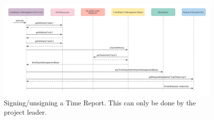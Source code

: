 \documentclass{article}
\begin{document}
\begin{figure}[H]
    \centering
    \includegraphics[scale=0.5]{images/signUnsignReports.png}
    \caption{Signing/unsigning a Time Report. This can only be done by the project leader.}
    \label{fig:signunsign}
\end{figure}



\end{document}
